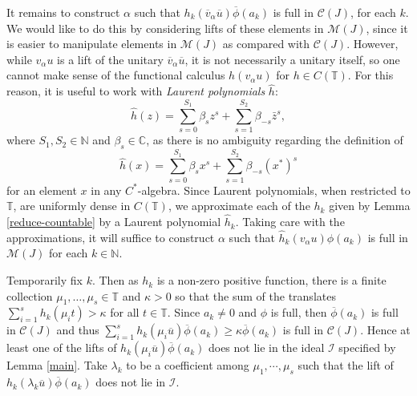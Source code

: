 \documentclass[reqno]{amsart}
\theoremstyle{definition}
\theoremstyle{remark}
\numberwithin{equation}{section}
\theoremstyle{definition}
\newcommand{\calC}{\mathcal{C}}
\newcommand{\calM}{\mathcal{M}}
\newcommand{\calI}{\mathcal{I}}
\begin{document}
It remains to construct $\alpha$ such that $h_{k}(\overline{v}_{\alpha}\overline{u})\overline{\phi}(a_{k})$ is full in $\calC(J)$, for each $k$. We would like to do this by considering lifts of these elements in $\calM(J)$, since it is easier to manipulate elements in $\calM(J)$ as compared with $\calC(J)$. However, while $v_{\alpha} u$ is a lift of the unitary $\overline{v}_\alpha \overline{u}$, it is not necessarily a unitary itself, so one cannot make sense of the functional calculus $h(v_\alpha u)$ for $h\in C(\mathbb{T})$. For this reason, it is useful to work with \emph{Laurent polynomials} $\hat{h}$: 
\begin{equation}
\hat{h}(z) = \sum_{s=0}^{S_{1}} \beta_{s} z^{s} + \sum_{s=1}^{S_{2}}\beta_{-s}\bar{z}^{s},
\end{equation} 
where $S_{1}, S_{2}\in \mathbb{N}$ and $\beta_{s}\in \mathbb{C}$, as there is no ambiguity regarding the definition of 
\begin{equation}
\hat{h}(x) = \sum_{s=0}^{S_{1}}\beta_{s}x^{s} + \sum_{s=1}^{S_{2}}\beta_{-s}(x^{\ast})^{s} 
\end{equation} 
for an element $x$ in any $C^*$-algebra. Since Laurent polynomials, when restricted to $\mathbb{T}$,
are uniformly dense in $C(\mathbb{T})$, we approximate each of the $h_{k}$ given by Lemma \ref{reduce-countable} by a Laurent polynomial $\hat{h}_{k}$. Taking care with the approximations, it 
will suffice to construct $\alpha$ such that $ \hat{h}_{k}(v_{\alpha} u) \phi(a_{k})$ is full in $\calM(J)$ for each $k\in \mathbb{N}$. 

Temporarily fix $k$. Then as $h_k$ is a non-zero positive function, there is a finite collection $\mu_1,\dots,\mu_{s}\in\mathbb T$ and $\kappa>0$ so that the sum of the translates $\sum_{i=1}^{s}h_k(\mu_{i}t)>\kappa$ for all $t\in\mathbb T$. Since $a_{k}\neq 0$ and $\phi$ is full, then $\overline{\phi}(a_{k})$ is full in $\calC(J)$ and thus $\sum_{i=1}^{s}h_k(\mu_{i}\overline{u}) \overline{\phi}(a_{k})\geq \kappa \overline{\phi}(a_{k})$ is full in $\calC(J)$. Hence at least one of the lifts of $h_k(\mu_{i}\overline{u}) \overline{\phi}(a_{k})$ does not lie in the ideal $\calI$ specified by Lemma \ref{main}. Take $\lambda_{k}$ to be a coefficient among $\mu_{1}, \cdots, \mu_{s}$ such that the lift of $h_k(\lambda_{k}\overline{u}) \overline{\phi}(a_{k})$ does not lie in $\calI$. 
\end{document}
